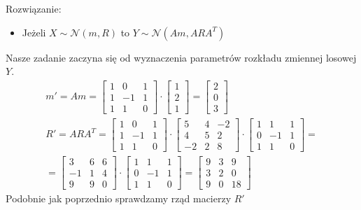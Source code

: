 Rozwiązanie:
\begin{itemize}
\item Jeżeli $ X\sim \mathcal N(m,R) $ to $ Y\sim \mathcal N(Am,ARA^T) $
\end{itemize}
Nasze zadanie zaczyna się od wyznaczenia parametrów rozkładu zmiennej losowej $ Y $.
\begin{gather*}
m'=Am=
\begin{bmatrix}
	1 & 0  & 1 \\
	1 & -1 & 1 \\
	1 & 1  & 0
\end{bmatrix}
\cdot
\begin{bmatrix}
	1 \\
	2 \\
	1
\end{bmatrix}
=
\begin{bmatrix}
	2 \\
	0 \\
	3
\end{bmatrix}\\
R'=ARA^T=
\begin{bmatrix}
	1 & 0  & 1 \\
	1 & -1 & 1 \\
	1 & 1  & 0
\end{bmatrix}\cdot
\begin{bmatrix}
	5  & 4 & -2 \\
	4  & 5 & 2  \\
	-2 & 2 & 8
\end{bmatrix}\cdot
\begin{bmatrix}
	1 & 1  & 1 \\
	0 & -1 & 1 \\
	1 & 1  & 0
\end{bmatrix}
=\\=
\begin{bmatrix}
	3  & 6 & 6 \\
	-1 & 1 & 4 \\
	9  & 9 & 0
\end{bmatrix}\cdot
\begin{bmatrix}
	1 & 1  & 1 \\
	0 & -1 & 1 \\
	1 & 1  & 0
\end{bmatrix}=
\begin{bmatrix}
	9 & 3 & 9  \\
	3 & 2 & 0  \\
	9 & 0 & 18
\end{bmatrix}
\end{gather*}
Podobnie jak poprzednio sprawdzamy rząd macierzy $ R' $
